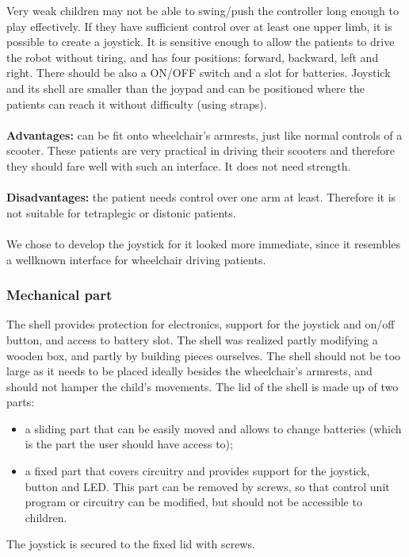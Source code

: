 \documentclass[a4paper,twoside]{book}
\begin{document}
Very weak children may not be able to swing/push the controller long enough to play effectively. If they have sufficient control over at least one upper limb, it is possible to create a joystick. It is sensitive enough to allow the patients to drive the robot without tiring, and has four positions: forward, backward, left and right. There should be also a ON/OFF switch and a slot for batteries. Joystick and its shell are smaller than the joypad and can be positioned where the patients can reach it without difficulty (using straps).
\\
\\
\textbf{Advantages:} can be fit onto wheelchair's armrests, just like normal controls of a scooter. These patients are very practical in driving their scooters and therefore they should fare well with such an interface. It does not need strength.
\\
\\
\textbf{Disadvantages:} the patient needs control over one arm at least. Therefore it is not suitable for tetraplegic or distonic patients.
\\
\\
We chose to develop the joystick for it looked more immediate, since it resembles a well\textendash known interface for wheelchair driving patients.
\\
\subsubsection{Mechanical part}

The shell provides protection for electronics, support for the joystick and on/off button, and access to battery slot. The shell was realized partly modifying a wooden box, and partly by building pieces ourselves. The shell should not be too large as it needs to be placed ideally besides the wheelchair's armrests, and should not hamper the child's movements.
The lid of the shell is made up of two parts:

\begin{itemize}
\item a sliding part that can be easily moved and allows to change batteries (which is the part the user should have access to);
\item a fixed part that covers circuitry and provides support for the joystick, button and LED. This part can be removed by screws, so that control unit program or circuitry can be modified, but should not be accessible to children.
\end{itemize}
The joystick is secured to the fixed lid with screws.
\end{document}
